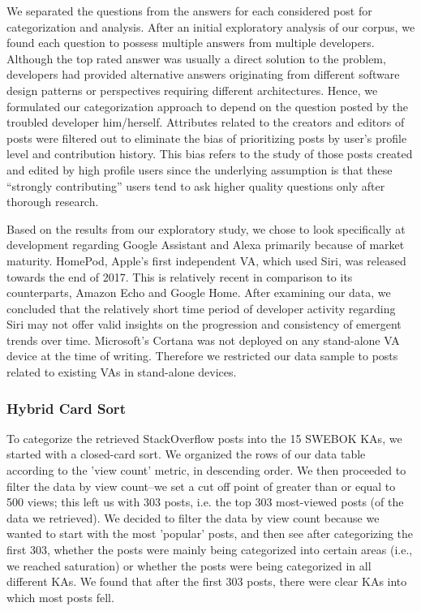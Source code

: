 \documentclass{sigchi}
\begin{document}
We separated the questions from the answers for each considered post for categorization and analysis. 
After an initial exploratory analysis of our corpus, we found each question to possess multiple answers from multiple developers. Although the top rated answer was usually a direct solution to the problem, developers had provided alternative answers originating from different software design patterns or perspectives requiring different architectures. Hence, we formulated our categorization approach to depend on the question posted by the troubled developer him/herself. 
Attributes related to the creators and editors of posts were filtered out to eliminate the bias of prioritizing posts by user's profile level and contribution history. This bias refers to the study of those posts created and edited by high profile users since the underlying assumption is that these ``strongly contributing'' users tend to ask higher quality questions only after thorough research.

Based on the results from our exploratory study, we chose to look specifically at development regarding Google Assistant and Alexa primarily because of market maturity. HomePod, Apple's first independent VA, which used Siri, was released towards the end of 2017. This is relatively recent in comparison to its counterparts, Amazon Echo and Google Home. After examining our data, we concluded that the relatively short time period of developer activity regarding Siri may not offer valid insights on the progression and consistency of emergent trends over time. Microsoft's Cortana was not deployed on any stand-alone VA device at the time of writing. Therefore we restricted our data sample to posts related to existing VAs in stand-alone devices.  

\subsubsection{Hybrid Card Sort}
To categorize the retrieved StackOverflow posts into the 15 SWEBOK KAs, we started with a closed-card sort. We organized the rows of our data table according to the 'view count' metric, in descending order. We then proceeded to filter the data by view count--we set a cut off point of greater than or equal to 500 views; this left us with 303 posts, i.e. the top 303 most-viewed posts (of the data we retrieved). We decided to filter the data by view count because we wanted to start with the most 'popular' posts, and then see after categorizing the first 303, whether the posts were mainly being categorized into certain areas (i.e., we reached saturation) or whether the posts were being categorized in all different KAs. We found that after the first 303 posts, there were clear KAs into which most posts fell.
\end{document}
